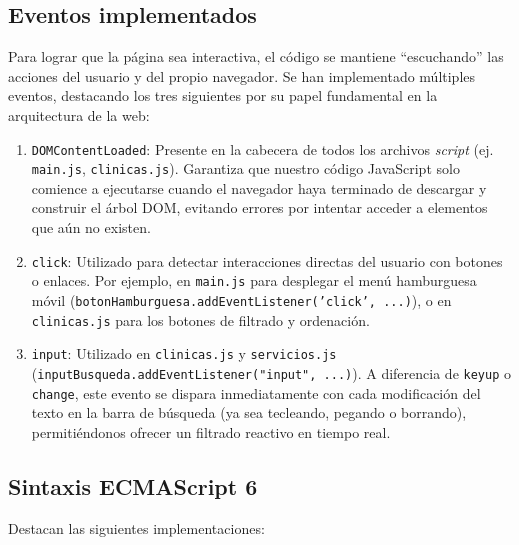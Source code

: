 \documentclass[11pt]{article}
\begin{document}
\subsection{Eventos implementados}

Para lograr que la página sea interactiva, el código se mantiene ``escuchando'' las acciones del usuario y del propio navegador. Se han implementado múltiples eventos, destacando los tres siguientes por su papel fundamental en la arquitectura de la web:

\begin{enumerate}
\item \texttt{DOMContentLoaded}: Presente en la cabecera de todos los archivos \textit{script} (ej. \texttt{main.js}, \texttt{clinicas.js}). Garantiza que nuestro código JavaScript solo comience a ejecutarse cuando el navegador haya terminado de descargar y construir el árbol DOM, evitando errores por intentar acceder a elementos que aún no existen.
\item \texttt{click}: Utilizado para detectar interacciones directas del usuario con botones o enlaces. Por ejemplo, en \texttt{main.js} para desplegar el menú hamburguesa móvil (\texttt{botonHamburguesa.addEventListener('click', ...)}), o en \texttt{clinicas.js} para los botones de filtrado y ordenación.
\item \texttt{input}: Utilizado en \texttt{clinicas.js} y \texttt{servicios.js} (\texttt{inputBusqueda.addEventListener("input", ...)}). A diferencia de \texttt{keyup} o \texttt{change}, este evento se dispara inmediatamente con cada modificación del texto en la barra de búsqueda (ya sea tecleando, pegando o borrando), permitiéndonos ofrecer un filtrado reactivo en tiempo real.
\end{enumerate}

\subsection{Sintaxis ECMAScript 6}

Destacan las siguientes implementaciones:
\end{document}
